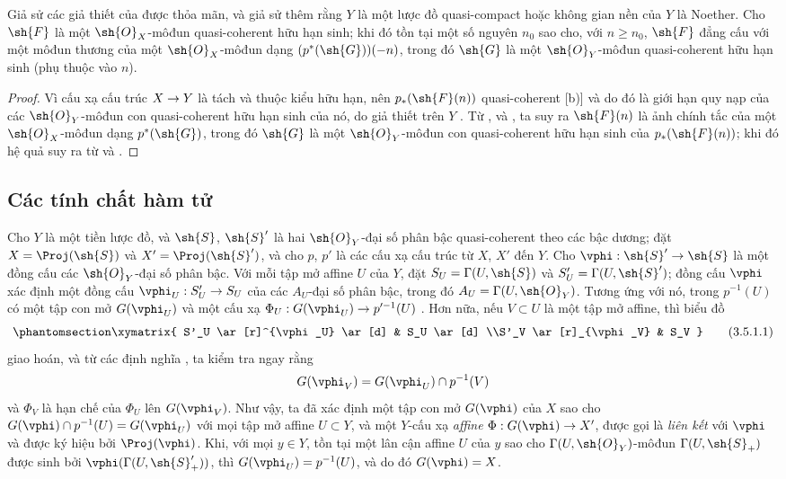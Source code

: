 \documentclass[oneside,10pt]{amsart}
\makeatletter
\renewcommand{\geq}{\geqslant}
\newcommand{\ega@arrow}[2]{\mathchoice{#1}{#2}{#2}{#2}}
\renewcommand{\to}{\ega@arrow{\longrightarrow}{\rightarrow}}
\newcommand{\oldpage}[2][]{\marginnote{\normalfont\footnotesize\textbf{#1}~|~#2}\ignorespaces}
\let\EGAOriginalLabel\label
\renewcommand{\label}[1]{\phantomsection\EGAOriginalLabel{#1}}
\makeatother
\begin{document}
\begin{corollary}[3.4.8]
\label{II.3.4.8}
Giả sử các giả thiết của  được thỏa mãn, và giả sử thêm rằng $Y$ là một lược đồ quasi-compact hoặc không gian nền của $Y$ là Noether.
Cho $\sh{F}$ là một $\sh{O}_X$-môđun quasi-coherent hữu hạn sinh;
khi đó tồn tại một số nguyên $n_0$ sao cho, với $n\geq n_0$, $\sh{F}$ đẳng cấu với một môđun thương của một $\sh{O}_X$-môđun dạng $(p^*(\sh{G}))(-n)$, trong đó $\sh{G}$ là một $\sh{O}_Y$-môđun quasi-coherent hữu hạn sinh (phụ thuộc vào $n$).
\end{corollary}

\begin{proof}
Vì cấu xạ cấu trúc $X\to Y$ là tách và thuộc kiểu hữu hạn, nên $p_*(\sh{F}(n))$ quasi-coherent [b)] và do đó là giới hạn quy nạp của các $\sh{O}_Y$-môđun con quasi-coherent hữu hạn sinh của nó, do giả thiết trên $Y$ .
Từ ,  và , ta suy ra $\sh{F}(n)$ là ảnh chính tắc của một $\sh{O}_X$-môđun dạng $p^*(\sh{G})$, trong đó $\sh{G}$ là một $\sh{O}_Y$-môđun con quasi-coherent hữu hạn sinh của $p_*(\sh{F}(n))$;
khi đó hệ quả suy ra từ  và .
\end{proof}

\subsection{Các tính chất hàm tử}
\label{subsection:II.3.5}

\begin{env}[3.5.1]
\label{II.3.5.1}
Cho $Y$ là một tiền lược đồ, và $\sh{S}$, $\sh{S}'$ là hai $\sh{O}_Y$-đại số phân bậc quasi-coherent theo các bậc dương;
đặt $X=\Proj(\sh{S})$ và $X'=\Proj(\sh{S}')$, và cho $p$, $p'$ là các cấu xạ cấu trúc từ $X$, $X'$ đến $Y$.
Cho $\vphi:\sh{S}'\to\sh{S}$ là một đồng cấu các $\sh{O}_Y$-đại số phân bậc.
Với mỗi tập mở affine $U$ của $Y$, đặt $S_U=\Gamma(U,\sh{S})$ và $S'_U=\Gamma(U,\sh{S}')$;
đồng cấu $\vphi$ xác định một đồng cấu $\vphi_U:S'_U\to S_U$ của các $A_U$-đại số phân bậc, trong đó $A_U=\Gamma(U,\sh{O}_Y)$.
Tương ứng với nó, trong $p^{-1}(U)$ có một tập con mở $G(\vphi_U)$ và một cấu xạ $\Phi_U:G(\vphi_U)\to p'^{-1}(U)$ .
Hơn nữa, nếu $V\subset U$ là một tập mở affine, thì biểu đồ
\[
\label{II.3.5.1.1}
  \xymatrix{
    S'_U \ar[r]^{\vphi_U} \ar[d]
    & S_U \ar[d]
  \\S'_V \ar[r]_{\vphi_V}
    & S_V
  }
\tag{3.5.1.1}
\]
giao hoán, và từ các định nghĩa , ta kiểm tra ngay rằng
\[
  G(\vphi_V)=G(\vphi_U)\cap p^{-1}(V)
\]
và $\Phi_V$ là hạn chế của $\Phi_U$ lên $G(\vphi_V)$.
Như vậy, ta đã xác định một tập con mở $G(\vphi)$ của $X$ sao cho $G(\vphi)\cap p^{-1}(U)=G(\vphi_U)$ với mọi tập mở affine $U\subset Y$, và một $Y$-cấu xạ
\oldpage[II]{62}
\emph{affine} $\Phi:G(\vphi)\to X'$, được gọi là \emph{liên kết} với $\vphi$ và được ký hiệu bởi $\Proj(\vphi)$.
Khi, với mọi $y\in Y$, tồn tại một lân cận affine $U$ của $y$ sao cho $\Gamma(U,\sh{O}_Y)$-môđun $\Gamma(U,\sh{S}_+)$ được sinh bởi $\vphi(\Gamma(U,\sh{S}'_+))$, thì $G(\vphi_U)=p^{-1}(U)$, và do đó $G(\vphi)=X$.
\end{env}
\end{document}
